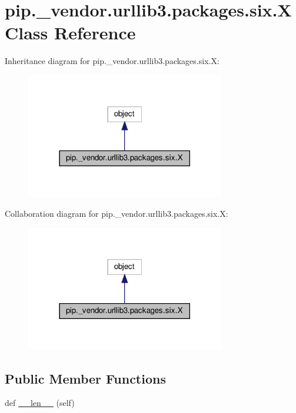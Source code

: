 \hypertarget{classpip_1_1__vendor_1_1urllib3_1_1packages_1_1six_1_1X}{}\section{pip.\+\_\+vendor.\+urllib3.\+packages.\+six.\+X Class Reference}
\label{classpip_1_1__vendor_1_1urllib3_1_1packages_1_1six_1_1X}


Inheritance diagram for pip.\+\_\+vendor.\+urllib3.\+packages.\+six.\+X\+:
\nopagebreak
\begin{figure}[H]
\begin{center}
\leavevmode
\includegraphics[width=246pt]{classpip_1_1__vendor_1_1urllib3_1_1packages_1_1six_1_1X__inherit__graph}
\end{center}
\end{figure}


Collaboration diagram for pip.\+\_\+vendor.\+urllib3.\+packages.\+six.\+X\+:
\nopagebreak
\begin{figure}[H]
\begin{center}
\leavevmode
\includegraphics[width=246pt]{classpip_1_1__vendor_1_1urllib3_1_1packages_1_1six_1_1X__coll__graph}
\end{center}
\end{figure}
\subsection*{Public Member Functions}
\begin{DoxyCompactItemize}
\item 
def \hyperlink{classpip_1_1__vendor_1_1urllib3_1_1packages_1_1six_1_1X_ac82809ac01719c1af7d67fdd66455862}{\+\_\+\+\_\+len\+\_\+\+\_\+} (self)
\end{DoxyCompactItemize}


